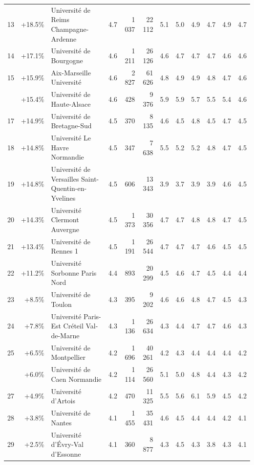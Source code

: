 \documentclass[11pt,french,landscape]{article}
\begin{document}
\begin{longtable}{rrlrrrrrrlrr}
\rowcolor{gray!6}  13 & +18.5\% & Université de Reims Champagne-Ardenne & 4.7 & 1 037 & 22 112 & 5.1 & 5.0 & 4.9 & 4.7 & 4.9 & 4.7\\
14 & +17.1\% & Université de Bourgogne & 4.6 & 1 211 & 26 126 & 4.6 & 4.7 & 4.7 & 4.7 & 4.6 & 4.6\\
\rowcolor{gray!6}  15 & +15.9\% & Aix-Marseille Université & 4.6 & 2 827 & 61 626 & 4.8 & 4.9 & 4.9 & 4.8 & 4.7 & 4.6\\
\addlinespace
16 & +15.4\% & Université de Haute-Alsace & 4.6 & 428 & 9 376 & 5.9 & 5.9 & 5.7 & 5.5 & 5.4 & 4.6\\
\rowcolor{gray!6}  17 & +14.9\% & Université de Bretagne-Sud & 4.5 & 370 & 8 135 & 4.6 & 4.5 & 4.8 & 4.5 & 4.7 & 4.5\\
18 & +14.8\% & Université Le Havre Normandie & 4.5 & 347 & 7 638 & 5.5 & 5.2 & 5.2 & 4.8 & 4.7 & 4.5\\
\rowcolor{gray!6}  19 & +14.8\% & Université de Versailles Saint-Quentin-en-Yvelines & 4.5 & 606 & 13 343 & 3.9 & 3.7 & 3.9 & 3.9 & 4.6 & 4.5\\
20 & +14.3\% & Université Clermont Auvergne & 4.5 & 1 373 & 30 356 & 4.7 & 4.7 & 4.8 & 4.8 & 4.7 & 4.5\\
\addlinespace
\rowcolor{gray!6}  21 & +13.4\% & Université de Rennes 1 & 4.5 & 1 191 & 26 544 & 4.7 & 4.7 & 4.7 & 4.6 & 4.5 & 4.5\\
22 & +11.2\% & Université Sorbonne Paris Nord & 4.4 & 893 & 20 299 & 4.5 & 4.6 & 4.7 & 4.5 & 4.4 & 4.4\\
\rowcolor{gray!6}  23 & +8.5\% & Université de Toulon & 4.3 & 395 & 9 202 & 4.6 & 4.6 & 4.8 & 4.7 & 4.5 & 4.3\\
24 & +7.8\% & Université Paris-Est Créteil Val-de-Marne & 4.3 & 1 136 & 26 634 & 4.3 & 4.4 & 4.7 & 4.7 & 4.6 & 4.3\\
\rowcolor{gray!6}  25 & +6.5\% & Université de Montpellier & 4.2 & 1 696 & 40 261 & 4.2 & 4.3 & 4.4 & 4.4 & 4.4 & 4.2\\
\addlinespace
26 & +6.0\% & Université de Caen Normandie & 4.2 & 1 114 & 26 560 & 5.1 & 5.0 & 4.8 & 4.4 & 4.3 & 4.2\\
\rowcolor{gray!6}  27 & +4.9\% & Université d'Artois & 4.2 & 470 & 11 325 & 5.5 & 5.6 & 6.1 & 5.9 & 4.5 & 4.2\\
28 & +3.8\% & Université de Nantes & 4.1 & 1 455 & 35 431 & 4.6 & 4.5 & 4.4 & 4.4 & 4.2 & 4.1\\
\rowcolor{gray!6}  29 & +2.5\% & Université d'Évry-Val d'Essonne & 4.1 & 360 & 8 877 & 4.3 & 4.5 & 4.3 & 3.8 & 4.3 & 4.1\\

\end{longtable}
\end{document}
